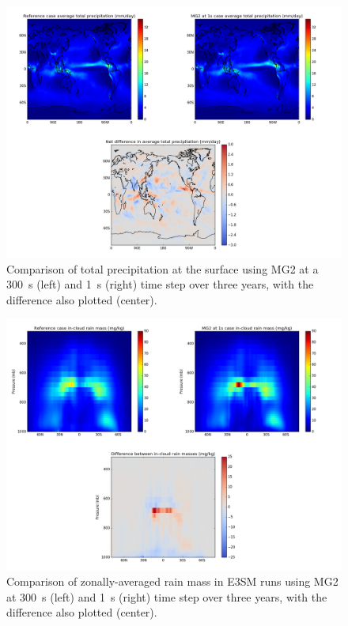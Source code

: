 \documentclass [11pt, proquest] {uwthesis}[2020/02/24]
\begin{document}
\begin{figure}[ht]
  \includegraphics[width=6.5in]{./MG2Figure13.png}
  \caption{Comparison of total precipitation at the surface using MG2 at a \SI{300}{\second} (left) and \SI{1}{\second} (right) time step over three years, with the difference also plotted (center).}
  \label{e3sm-prect-comparison}
\end{figure}

\begin{figure}[ht]
  \includegraphics[width=6.5in]{./MG2Figure14.png}
  \caption{Comparison of zonally-averaged rain mass in E3SM runs using MG2 at \SI{300}{\second} (left) and \SI{1}{\second} (right) time step over three years, with the difference also plotted (center).}
  \label{e3sm-rain-comparison}
\end{figure}
\end{document}
